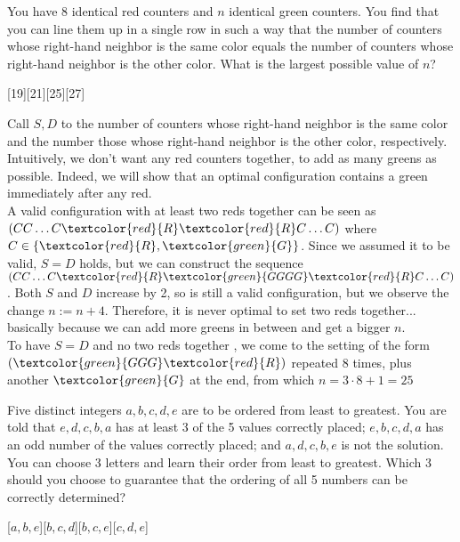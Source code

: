 \begin{problem}[A][4][Spring 2008 P15]
    You have 8 identical red counters and $n$ identical green counters. You find that you can line them up in a single row in such a way that the number of counters whose right-hand neighbor is the same color equals the number of counters whose right-hand neighbor is the other color. What is the largest possible value of $n$?
\end{problem}
[19][21][25][27]

\begin{solution}[D]
    Call $S,D$ to the number of counters whose right-hand neighbor is the same color and the number those whose right-hand neighbor is the other color, respectively. Intuitively, we don't want any red counters together, to add as many greens as possible. Indeed, we will show that an optimal configuration contains a green immediately after any red. \\[3mm]
    A valid configuration with at least two reds together can be seen as $(CC\ldots C \textcolor{red}{R} \textcolor{red}{R} C  \ldots C)$ where $C \in \{ \textcolor{red}{R} , \textcolor{green}{G}\}$. Since we assumed it to be valid, $S=D$ holds, but we can construct the sequence $(CC\ldots C \textcolor{red}{R} \textcolor{green}{GGGG}  \textcolor{red}{R} C  \ldots C)$. Both $S$ and $D$ increase by 2, so is still a valid configuration, but we observe the change $n := n + 4$. Therefore, it is never optimal to set two reds together... basically because we can add more greens in between and get a bigger $n$. \\[3mm]
    To have $S=D$ and no two reds together , we come to the setting of the form $( \textcolor{green}{GGG} \textcolor{red}{R})$ repeated 8 times, plus another $\textcolor{green}{G}$ at the end, from which $n = 3 \cdot 8 + 1 = \boxed{25}$
\end{solution}

\begin{problem}[A][5][Fall 2019 P20]
    Five distinct integers $a, b, c, d, e$ are to be ordered from least to greatest. You are told that $e, d, c, b, a$ has at least 3 of the 5 values correctly placed; $e, b, c, d, a$ has an odd number of the values correctly placed; and $a, d, c, b, e$ is not the solution. You can choose 3 letters and learn their order from least to greatest. Which 3 should you choose to guarantee that the ordering of all 5 numbers can be correctly determined?
\end{problem}
    [$a, b, e$][$b, c, d$][$b, c, e$][$c, d, e$]

